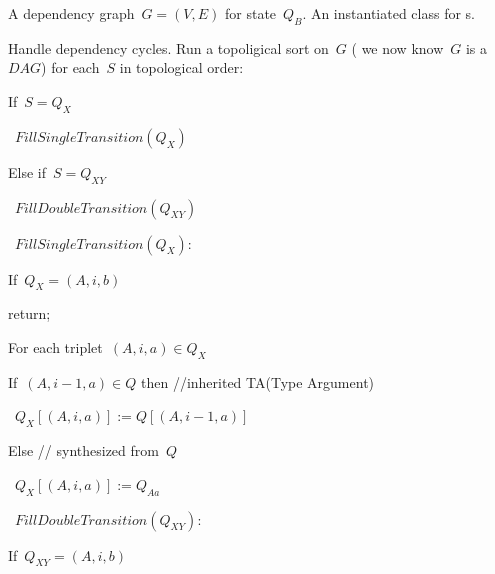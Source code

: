 \begin{algorithmic}
  \begin{description}
    \STATE [{Input:}] A dependency graph~$G=(V,E)$ for state~$Q_{B}$.
    \STATE [{Output:}] An instantiated class for s.
    \STATE [{Method:}]~
    \begin{enumerate}
      \STATE Handle dependency cycles.
      \STATE Run a topoligical sort on~$G$ ( we now know~$G$ is a~$DAG$)
      \STATE for each~$S$ in topological order:
            \begin{enumerate}
              \STATE If~$S=Q_{X}$
                    \begin{enumerate}
                      \STATE~$FillSingleTransition(Q_{X})$
                    \end{enumerate}
              \STATE Else if~$S=Q_{XY}$
                    \begin{enumerate}
                      \STATE~$FillDoubleTransition(Q_{XY})$
                    \end{enumerate}
            \end{enumerate}
    \end{enumerate}
    \begin{description}
      \STATE [{Function}]~$FillSingleTransition(Q_{X}):$
      \begin{enumerate}
        \STATE If~$Q_{X}=(A,i,b)$
              \begin{enumerate}
                \STATE return;
              \end{enumerate}
        \STATE For each triplet~$(A,i,a)∈Q_{X}$
              \begin{enumerate}
                \STATE If~$(A,i-1,a)∈Q$ then //inherited TA(Type Argument)
                      \begin{enumerate}
                        \STATE~$Q_{X}[(A,i,a)]:=Q[(A,i-1,a)]$
                      \end{enumerate}
                \STATE Else // synthesized from~$Q$
                      \begin{enumerate}
                        \STATE~$Q_{X}[(A,i,a)]:=Q_{Aa}$
                      \end{enumerate}
              \end{enumerate}
      \end{enumerate}
      \STATE [{Function}]~$FillDoubleTransition(Q_{XY})$:
      \begin{enumerate}
        \STATE If~$Q_{XY}=(A,i,b)$

\end{enumerate}
\end{description}
\end{description}
\end{algorithmic}
